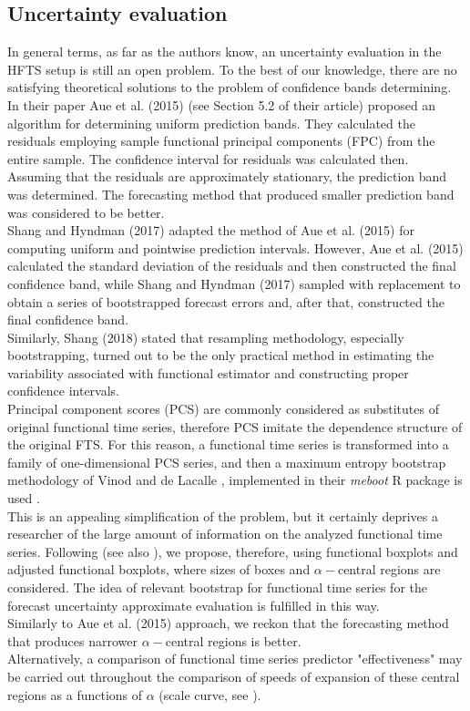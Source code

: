 \documentclass[12pt,a4paper]{article}
\numberwithin{equation}{section}
\begin{document}
\subsection{Uncertainty evaluation}
In general terms, as far as the authors know, an uncertainty evaluation in the HFTS setup is still an open problem. To the best of our knowledge, there are no satisfying theoretical solutions to the problem of confidence bands determining.
In their paper Aue et al. (2015) \cite{aue} (see Section 5.2 of their article) proposed an algorithm for determining uniform prediction bands.
They calculated the residuals employing sample functional principal components (FPC) from the entire sample. The confidence interval for residuals was calculated then. Assuming that the residuals are approximately stationary, the prediction band was determined. The forecasting method that produced smaller prediction band was considered to be better.
\\ Shang and Hyndman (2017) \cite{Shang} adapted the method of Aue et al. (2015) \cite{aue} for computing uniform and pointwise prediction intervals. 
However, Aue et al. (2015) calculated the standard deviation of the residuals and then constructed the final confidence band, while Shang and Hyndman (2017) sampled with replacement to obtain a series of bootstrapped forecast errors and, after that, constructed the final confidence band.
\\ Similarly, Shang (2018) \cite{shang2018} stated that resampling methodology, especially
bootstrapping, turned out to be the only practical method
in estimating the variability associated with functional estimator and constructing proper confidence intervals.
\\ Principal component scores (PCS) are commonly considered as substitutes of original functional time series, therefore PCS imitate the dependence structure of the original FTS.
For this reason, a functional time series is transformed into a family of one-dimensional PCS series, and then a maximum entropy bootstrap methodology of Vinod and de Lacalle \cite{Vinod}, implemented in their \textit{meboot} R package is used \cite{shang2018}. 
\\ This is an appealing simplification of the problem, but it certainly deprives a researcher of the large amount of information on the analyzed functional time series. Following \cite{Lopez_scale} (see also \cite{Tarabelloni}), we propose, therefore, using functional boxplots and adjusted functional boxplots, where sizes of boxes and $\alpha-$central regions are considered. The idea of relevant bootstrap for functional time series for the forecast uncertainty approximate evaluation is fulfilled in this way.   
\\ Similarly to Aue et al. (2015) approach, we reckon that  the forecasting method that produces narrower $\alpha-$central regions is better.
\\ Alternatively, a comparison of functional time series predictor "effectiveness" may be carried out throughout the comparison of speeds of expansion of these central regions as a functions of $\alpha$ (scale curve, see \cite{Lopez_scale}).
\end{document}
